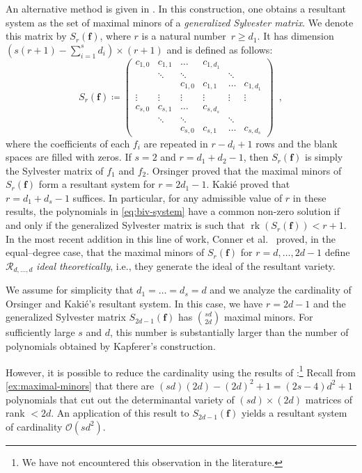 \documentclass[11pt,a4paper]{article}
\numberwithin{equation}{section}
\newcommand{\cR}{\mathcal{R}}
\newcommand{\cO}{\mathcal{O}}
\newcommand{\ff}{\ensuremath{\boldsymbol{f}}}
\DeclareMathOperator{\rk}{rk}
\begin{document}
An alternative method is given in \cite{Orsinger-51,Kakie-76}.
In this construction, one obtains a resultant system as the set of maximal minors of a \emph{generalized Sylvester matrix}.
We denote this matrix by $S_r(\ff)$, 
where $r$ is a natural number~$r\geq d_1$. 
It has dimension $\left(s(r+1)-\sum_{i=1}^s d_i\right)\times (r+1)$
and is defined as follows:
\begin{equation}
	S_r(\ff)\coloneqq \begin{pmatrix}
		c_{1,0} & c_{1,1} & \dots & c_{1,d_1} & &  \\
		 & \ddots & \ddots & & \ddots & \\
		& & c_{1,0} & c_{1,1} & \dots & c_{1,d_1} \\
		\vdots & \vdots & \vdots & \vdots & \vdots & \vdots\\
		c_{s,0} & c_{s,1} & \dots & c_{s,d_s} & & \\
		 & \ddots & \ddots & & \ddots & \\
		 & & c_{s,0} & c_{s,1} & \dots & c_{s,d_s} 
	\end{pmatrix} 
	\enspace,
\end{equation}
where the coefficients of each $f_i$ are repeated in $r-d_i+1$ rows and the blank spaces are filled with zeros.
If $s=2$ and $r=d_1+d_2-1$, then $S_r(\ff)$ is simply the Sylvester matrix of $f_1$ and $f_2$.
Orsinger \cite{Orsinger-51} proved that the maximal minors of $S_r(\ff)$ form a resultant system for $r = 2d_1 -1$.
Kaki\'{e} \cite{Kakie-76} proved that $r=d_1+d_s-1$ suffices.
In particular, for any admissible value of $r$ in these results, 
the polynomials in \eqref{eq:biv-system} have a common non-zero solution if and only if the generalized Sylvester matrix is such that $\rk(S_r(\ff))<r+1$.
In the most recent addition in this line of work, 
Conner et al.~\cite{CMSS-25}  proved, in the equal--degree case, that the maximal minors of $S_r(\ff)$ for $r=d,\dots,2d-1$ define $\cR_{d,\dots,d}$ \emph{ideal theoretically}, i.e., they generate the ideal of the resultant variety.

We assume for simplicity that $d_1=\dots=d_s=d$ and we analyze the cardinality of Orsinger and Kaki\'{e}'s resultant system.
In this case, we have $r=2d-1$ and the generalized Sylvester matrix $S_{2d-1}(\ff)$ has $\binom{sd}{2d}$ maximal minors. 
For sufficiently large $s$ and $d$, this number is substantially larger than the number of polynomials obtained by Kapferer's construction.

However, it is possible to reduce the cardinality using the results of \cite{Bruns-89,Bruns-Schwanzl-90}:\footnote{We have not encountered this observation in the literature.} 
Recall from \cref{ex:maximal-minors} that there are $(sd)(2d)-(2d)^2+1=(2s-4)d^2+1$ polynomials that cut out the determinantal variety of $(sd)\times(2d)$ matrices of rank $<2d$.
An application of this result to $S_{2d-1}(\ff)$ yields a resultant system of cardinality $\cO(s d^2)$.
\end{document}

